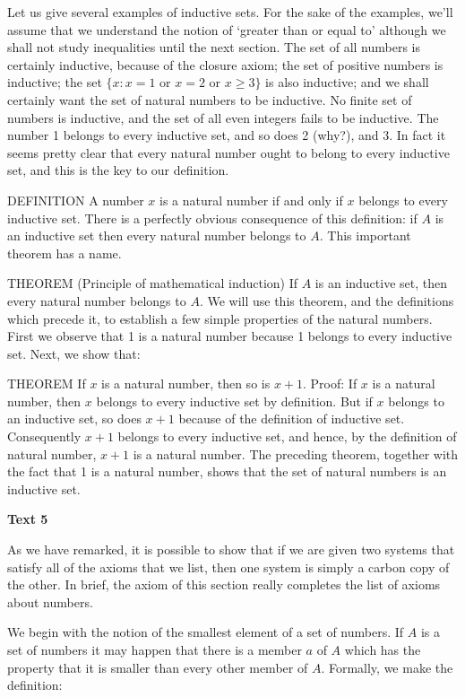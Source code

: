 \documentclass[a4paper]{article}
\newcommand{\ESect}[1]{\medskip\par{\large \textbf{#1}}\par}
\begin{document}
Let us give several examples of inductive sets. For the sake of the examples, we'll assume that we understand the notion
of `greater than or equal to' although we shall not study inequalities until the next section. The set of all numbers is
certainly inductive, because of the closure axiom; the set of positive numbers is inductive; the set $\{x : x = 1$ or $x=2$
or $x \geqslant 3 \}$ is also inductive; and we shall certainly want the set of natural numbers to be inductive. No finite
set of numbers is inductive, and the set of all even integers fails to be inductive. The number 1 belongs to every
inductive set, and so does 2 (why?), and 3. In fact it seems pretty clear that every natural number ought to belong to
every inductive set, and this is the key to our definition.

DEFINITION A number $x$ is a natural number if and only if $x$ belongs to every inductive set. There is a perfectly obvious
consequence of this definition: if $A$ is an inductive set then every natural number belongs to $A$. This important theorem
has a name.

THEOREM (Principle of mathematical induction) If $A$ is an inductive set, then every natural number belongs to $A$.
We will use this theorem, and the definitions which precede it, to establish a few simple properties of the natural numbers.
First we observe that 1 is a natural number because 1 belongs to every inductive set. Next, we show that:

THEOREM If $x$ is a natural number, then so is $x + 1$. Proof: If $x$ is a natural number, then $x$ belongs to every inductive
set by definition. But if $x$ belongs to an inductive set, so does $x + 1$ because of the definition of inductive set.
Consequently $x + 1$ belongs to every inductive set, and hence, by the definition of natural number, $x + 1$ is a natural number.
The preceding theorem, together with the fact that 1 is a natural number, shows that the set of natural numbers is an inductive set.

\ESect{Text 5}
As we have remarked, it is possible to show that if we are given two systems that satisfy all of the axioms that we list,
then one system is simply a carbon copy of the other. In brief, the axiom of this section really completes the list of
axioms about numbers.

We begin with the notion of the smallest element of a set of numbers. If $A$ is a set of numbers it may happen that there is
a member $a$ of $A$ which has the property that it is smaller than every other member of $A$. Formally, we make the definition:
\end{document}
